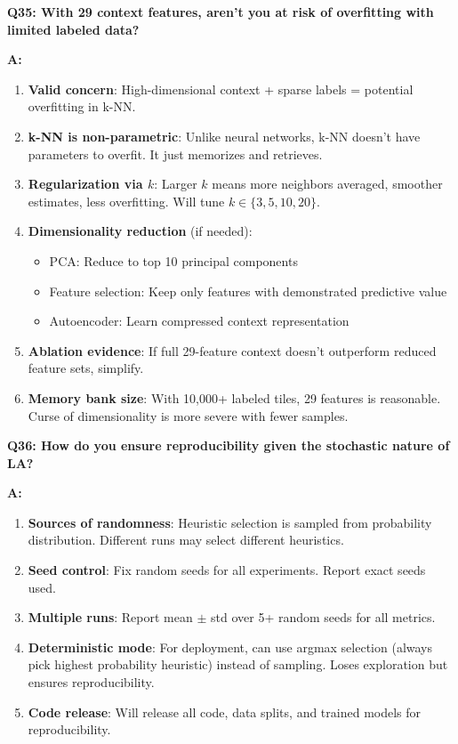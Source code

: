\documentclass[11pt]{article}
\begin{document}
\textbf{Q35: With 29 context features, aren't you at risk of overfitting with limited labeled data?}

\textbf{A:}

\begin{enumerate}
    \item \textbf{Valid concern}: High-dimensional context + sparse labels = potential overfitting in k-NN.

    \item \textbf{k-NN is non-parametric}: Unlike neural networks, k-NN doesn't have parameters to overfit. It just memorizes and retrieves.

    \item \textbf{Regularization via $k$}: Larger $k$ means more neighbors averaged, smoother estimates, less overfitting. Will tune $k \in \{3, 5, 10, 20\}$.

    \item \textbf{Dimensionality reduction} (if needed):
    \begin{itemize}
        \item PCA: Reduce to top 10 principal components
        \item Feature selection: Keep only features with demonstrated predictive value
        \item Autoencoder: Learn compressed context representation
    \end{itemize}

    \item \textbf{Ablation evidence}: If full 29-feature context doesn't outperform reduced feature sets, simplify.

    \item \textbf{Memory bank size}: With 10,000+ labeled tiles, 29 features is reasonable. Curse of dimensionality is more severe with fewer samples.
\end{enumerate}

\textbf{Q36: How do you ensure reproducibility given the stochastic nature of LA?}

\textbf{A:}

\begin{enumerate}
    \item \textbf{Sources of randomness}: Heuristic selection is sampled from probability distribution. Different runs may select different heuristics.

    \item \textbf{Seed control}: Fix random seeds for all experiments. Report exact seeds used.

    \item \textbf{Multiple runs}: Report mean $\pm$ std over 5+ random seeds for all metrics.

    \item \textbf{Deterministic mode}: For deployment, can use argmax selection (always pick highest probability heuristic) instead of sampling. Loses exploration but ensures reproducibility.

    \item \textbf{Code release}: Will release all code, data splits, and trained models for reproducibility.
\end{enumerate}
\end{document}
